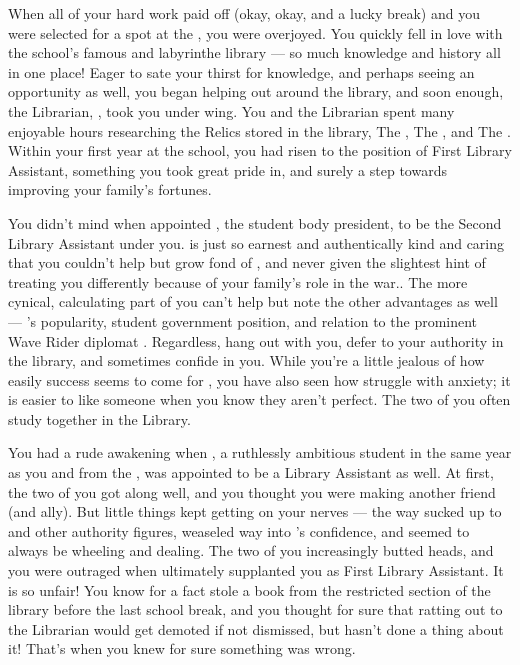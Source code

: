 \documentclass[char]{GL2020}
\begin{document}
When all of your hard work paid off (okay, okay, and a lucky break) and you were selected for a spot at the \pSchool{}, you were overjoyed. You quickly fell in love with the school’s famous and labyrinthe library — so much knowledge and history all in one place! Eager to sate your thirst for knowledge, and perhaps seeing an opportunity as well, you began helping out around the library, and soon enough, the Librarian, \cLibrarian{\full}, took you under \cLibrarian{\their} wing. You and the Librarian spent many enjoyable hours researching the Relics stored in the library, The \iLariat{}, The \iNet{}, and The \iScythe{}. Within your first year at the school, you had risen to the position of First Library Assistant, something you took great pride in, and surely a step towards improving your family’s fortunes.

You didn't mind when \cLibrarian{} appointed \cPresident{\full}, the student body president, to be the Second Library Assistant under you. \cPresident{} is just so earnest and authentically kind and caring that you couldn’t help but grow fond of \cPresident{\them}, and \cPresident{\theyhave} never given the slightest hint of treating you differently because of your family’s role in the war.. The more cynical, calculating part of you can’t help but note the other advantages as well — \cPresident{}’s popularity, student government position, and relation to the prominent Wave Rider diplomat \cHeadDiplomat{\full}. Regardless, \cPresident{\they} hang\cPresident{\verbs} out with you, defer\cPresident{\verbs} to your authority in the library, and sometimes confide\cPresident{\verbs} in you. While you're a little jealous of how easily success seems to come for \cPresident{}, you have also seen how \cPresident{\they} struggle\cPresident{\verbs} with anxiety; it is easier to like someone when you know they aren't perfect. The two of you often study together in the Library.

You had a rude awakening when \cAmbition{\full}, a ruthlessly ambitious student in the same year as you and from the \pTech{}, was appointed to be a Library Assistant as well. At first, the two of you got along well, and you thought you were making another friend (and ally). But little things kept getting on your nerves — the way \cAmbition{\they} sucked up to \cLibrarian{} and other authority figures, weaseled \cAmbition{\their} way into \cLibrarian{}’s confidence, and seemed to always be wheeling and dealing. The two of you increasingly butted heads, and you were outraged when \cAmbition{} ultimately supplanted you as First Library Assistant. It is so unfair! You know for a fact \cAmbition{} stole a book from the restricted section of the library before the last school break, and you thought for sure that ratting \cAmbition{\them} out to the Librarian would get \cAmbition{\them} demoted if not dismissed, but \cLibrarian{} hasn't done a thing about it! That's when you knew for sure something was wrong. 
\end{document}
